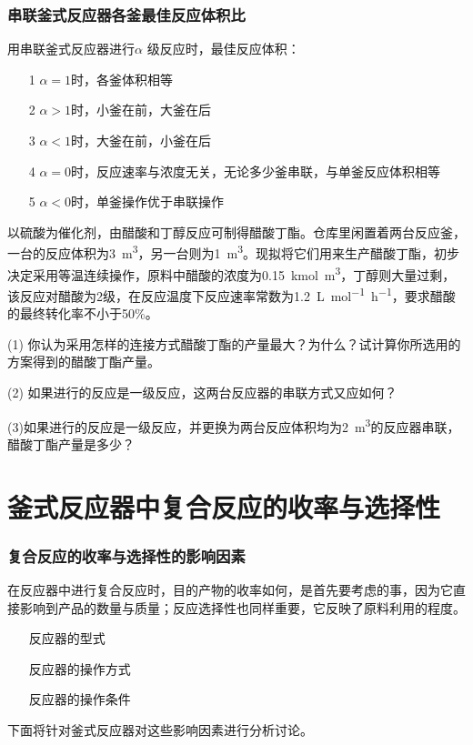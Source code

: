 \documentclass[dvipsnames, svgnames, x11names]{beamer}
\begin{document}
\begin{frame}
    \frametitle{串联釜式反应器各釜最佳反应体积比}

    用串联釜式反应器进行$\alpha$ 级反应时，最佳反应体积：
    \begin{itemize}
        \item[1] $\alpha=1$时，各釜体积相等
        \item[2] $\alpha>1$时，小釜在前，大釜在后
        \item[3] $\alpha<1$时，大釜在前，小釜在后
        \item[4] $\alpha=0$时，反应速率与浓度无关，无论多少釜串联，与单釜反应体积相等
        \item[5] $\alpha<0$时，单釜操作优于串联操作
    \end{itemize}

\end{frame}


\begin{frame}[t]{}
    \begin{example}
        以硫酸为催化剂，由醋酸和丁醇反应可制得醋酸丁酯。仓库里闲置着两台反应釜，一台的反应体积为\SI{3}{m^3}，另一台则为\SI{1}{m^3}。现拟将它们用来生产醋酸丁酯，初步决定采用等温连续操作，原料中醋酸的浓度为\SI{0.15}{kmol.m^3}，丁醇则大量过剩，该反应对醋酸为2级，在反应温度下反应速率常数为\SI{1.2}{L.mol^{-1}.h^{-1}}，要求醋酸的最终转化率不小于50\%。
        
        (1) 你认为采用怎样的连接方式醋酸丁酯的产量最大？为什么？试计算你所选用的方案得到的醋酸丁酯产量。
        
        (2) 如果进行的反应是一级反应，这两台反应器的串联方式又应如何？

        (3)如果进行的反应是一级反应，并更换为两台反应体积均为\SI{2}{m^3}的反应器串联，醋酸丁酯产量是多少？
    \end{example}

\end{frame}


\section{釜式反应器中复合反应的收率与选择性}


\begin{frame}
    \frametitle{复合反应的收率与选择性的影响因素}

    \large 在反应器中进行复合反应时，目的产物的收率如何，是首先要考虑的事，因为它直接影响到产品的数量与质量；反应选择性也同样重要，它反映了原料利用的程度。
    
    \begin{itemize}
        \item[\bullet] 反应器的型式
        \item[\bullet] 反应器的操作方式
        \item[\bullet] 反应器的操作条件
    \end{itemize}
    下面将针对釜式反应器对这些影响因素进行分析讨论。

\end{frame}
\end{document}
